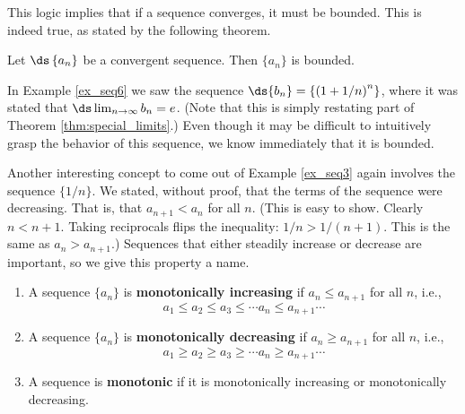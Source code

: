 This logic implies that if a sequence converges, it must be bounded. This is indeed true, as stated by the following theorem.

{Let $\ds \left\{a_n\right\}$ be a convergent sequence. Then $\{a_n\}$ is bounded.
}


In Example \ref{ex_seq6} we saw the sequence $\ds \{b_n\} = \left\{\left(1+1/n\right)^{n}\right\}$, where it was stated that $\ds \lim_{n\to\infty} b_n = e$. (Note that this is simply restating part of Theorem \ref{thm:special_limits}.) Even though it may be difficult to intuitively grasp the behavior of this sequence, we know immediately that it is bounded.

Another interesting concept to come out of Example \ref{ex_seq3} again involves the sequence $\{1/n\}$. We stated, without proof, that the terms of the sequence were decreasing. That is, that $a_{n+1} < a_n$ for all $n$. (This is easy to show. Clearly $n < n+1$. Taking reciprocals flips the inequality: $1/n > 1/(n+1)$. This is the same as $a_n > a_{n+1}$.) Sequences that either steadily increase or decrease are important, so we give this property a name.

{\begin{enumerate}
\item		A sequence $\{a_n\}$ is \textbf{monotonically increasing} if $a_n \leq a_{n+1}$ for all $n$, i.e.,
 $$a_1 \leq a_2 \leq a_3 \leq \cdots a_n \leq a_{n+1} \cdots$$
 \item	A sequence $\{a_n\}$ is \textbf{monotonically decreasing} if $a_n \geq a_{n+1}$ for all $n$, i.e.,
 $$a_1 \geq a_2 \geq a_3 \geq \cdots a_n \geq a_{n+1} \cdots$$
 \item	A sequence is \textbf{monotonic} if it is monotonically increasing or monotonically decreasing.
 \end{enumerate}
}


